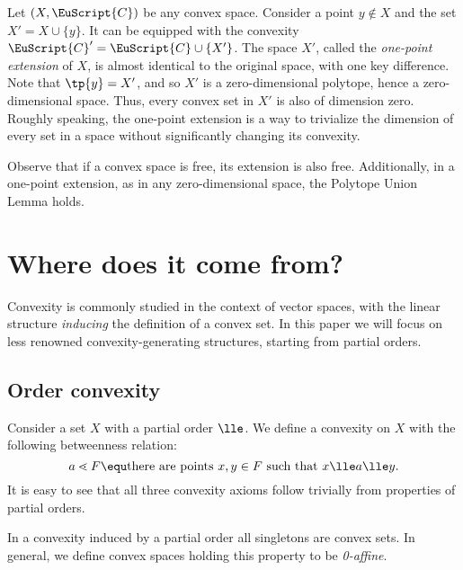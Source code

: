 \documentclass[12pt, a4paper]{article}
\newcommand{\C}{\EuScript{C}}
\newcommand{\btw}{\lessdot}
\begin{document}
\begin{definition}\label{def-0-dim-ext}
    Let \((X, \C)\) be any convex space. Consider a point \(y \nin X\) and the set \(X' = X \cup \{y\}\). It can be equipped with the convexity \(\C' = \C \cup \{X'\}\). The space \(X'\), called the \textit{one-point extension} of \(X\), is almost identical to the original space, with one key difference. Note that \(\tp{y} = X'\), and so \(X'\) is a zero-dimensional polytope, hence a zero-dimensional space. Thus, every convex set in \(X'\) is also of dimension zero. Roughly speaking, the one-point extension is a way to trivialize the dimension of every set in a space without significantly changing its convexity.
\end{definition}

\begin{remark}
    Observe that if a convex space is free, its extension is also free. Additionally, in a one-point extension, as in any zero-dimensional space, the Polytope Union Lemma holds.
\end{remark}







\section{Where does it come from?}

Convexity is commonly studied in the context of vector spaces, with the linear structure \textit{inducing} the definition of a convex set. In this paper we will focus on less renowned convexity-generating structures, starting from partial orders.

\subsection{Order convexity}\label{order}

\begin{definition}\label{def-ord-conv}
    Consider a set \(X\) with a partial order \(\lle\). We define a convexity on \(X\) with the following betweenness relation: \[a \btw F \equ \mbox{there are points } x, y \in F \mbox{ such that } x \lle a \lle y.\] It is easy to see that all three convexity axioms follow trivially from properties of partial orders.
\end{definition}

\begin{observation}\label{ord-singl-obs}
    In a convexity induced by a partial order all singletons are convex sets. In general, we define convex spaces holding this property to be \textit{0-affine}.
\end{observation}
\end{document}
